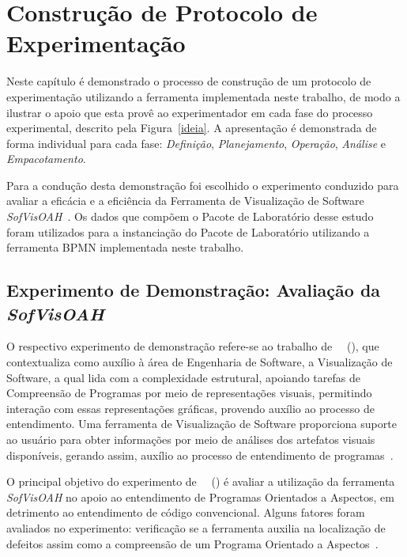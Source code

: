 \chapter{Construção de Protocolo de Experimentação}
\label{cp:construcao}

Neste capítulo é demonstrado o processo de construção de um protocolo de experimentação utilizando a ferramenta implementada neste trabalho, de modo a ilustrar o apoio que esta provê ao experimentador em cada fase do processo experimental, descrito pela Figura~\ref{ideia}. A apresentação é demonstrada de forma individual para cada fase: \textit{Definição}, \textit{Planejamento}, \textit{Operação}, \textit{Análise} e \textit{Empacotamento}.

Para a condução desta demonstração foi escolhido o experimento conduzido para avaliar a eficácia e a eficiência da Ferramenta de Visualização de Software \textit{SofVisOAH}~\cite{d2012avaliaccao}. Os dados que compõem o Pacote de Laboratório desse estudo foram utilizados para a instanciação do Pacote de Laboratório utilizando a ferramenta BPMN implementada neste trabalho.

\section{Experimento de Demonstração: Avaliação da \textit{SofVisOAH}}

O respectivo experimento de demonstração refere-se ao trabalho de ~~(\citeyear{d2012avaliaccao}), que contextualiza como auxílio à área de Engenharia de Software, a Visualização de Software, a qual lida com a complexidade estrutural, apoiando tarefas de Compreensão de Programas por meio de representações visuais, permitindo interação com essas representações gráficas, provendo auxílio ao processo de entendimento. Uma ferramenta de Visualização de Software proporciona suporte ao usuário para obter informações por meio de análises dos artefatos visuais disponíveis, gerando assim, auxílio ao processo de entendimento de programas~\cite{d2012avaliaccao}.

O principal objetivo do experimento de ~~(\citeyear{d2012avaliaccao}) é avaliar a utilização da ferramenta \textit{SofVisOAH} no apoio ao entendimento de Programas Orientados
a Aspectos, em detrimento ao entendimento de código convencional. Alguns fatores foram avaliados no experimento: verificação se a ferramenta auxilia na localização de defeitos assim como a compreensão de um Programa Orientado a Aspectos~\cite{d2012avaliaccao}.

